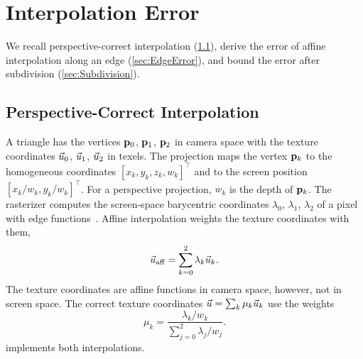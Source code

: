 \section{Interpolation Error}\label{sec:InterpolationError}
We recall perspective-correct interpolation (\cref{sec:PerspectiveCorrect}), derive the error of affine interpolation along an edge (\cref{sec:EdgeError}), and bound the error after subdivision (\cref{sec:Subdivision}).

\subsection{Perspective-Correct Interpolation}\label{sec:PerspectiveCorrect}
A triangle has the vertices $\mathbf{p}_0$, $\mathbf{p}_1$, $\mathbf{p}_2$ in camera space with the texture coordinates $\vec{u}_0$, $\vec{u}_1$, $\vec{u}_2$ in texels.
The projection maps the vertex $\mathbf{p}_k$ to the homogeneous coordinates $[x_k, y_k, z_k, w_k]^\top$ and to the screen position $[x_k/w_k, y_k/w_k]^\top$.
For a perspective projection, $w_k$ is the depth of $\mathbf{p}_k$.
The rasterizer computes the screen-space barycentric coordinates $\lambda_0$, $\lambda_1$, $\lambda_2$ of a pixel with edge functions~\cite{Pineda88PAP}.
Affine interpolation weights the texture coordinates with them,
\begin{equation}
    \vec{u}_\mathrm{aff} = \sum_{k=0}^{2} \lambda_k \vec{u}_k.
\end{equation}
The texture coordinates are affine functions in camera space, however, not in screen space.
The correct texture coordinates $\vec{u} = \sum_{k} \mu_k \vec{u}_k$ use the weights~\cite{Heckbert91IPT}
\begin{equation}
    \mu_k = \frac{\lambda_k / w_k}{\sum_{j=0}^{2} \lambda_j / w_j}.
    \label{eq:Weights}
\end{equation}
 implements both interpolations.




